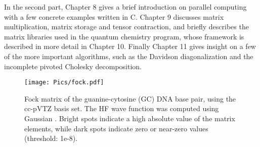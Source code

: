 In the second part, Chapter 8 gives a brief introduction on parallel computing with a few concrete examples written in C. Chapter 9 discusses matrix multiplication, matrix storage and tensor contraction, and briefly describes the matrix libraries used in the \mchem{} quantum chemistry program, whose framework is described in more detail in Chapter 10. Finally Chapter 11 gives insight on a few of the more important algorithms, such as the Davidson diagonalization and the incomplete pivoted Cholesky decomposition.    

\begin{figure}
\centering
\texttt{[image: Pics/fock.pdf]}
\caption[Fock matrix of the GC DNA base pair]{Fock matrix of the guanine-cytosine (GC) DNA base pair, using the cc-pVTZ basis set. The HF wave function was computed using Gaussian \cite{Fri2016}. Bright spots indicate a high absolute value of the matrix elements, while dark spots indicate zero or near-zero values (threshold: 1e-8).}
\label{SparseExample}
\end{figure}